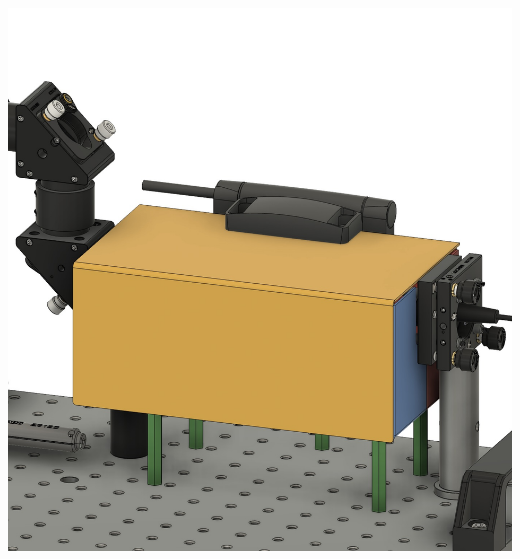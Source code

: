 \begin{minipage}{\textwidth}
    \begin{minipage}[c]{0.48\textwidth}
        \begin{center}
            \includegraphics[width=\textwidth]{assets/figures/Protections_laser/Securite_mecanique/Protection_entree_laser/model_3D_ferme.jpeg}
        \end{center}
        \label{model_3D_ferme}
    \end{minipage}\hfill
    \begin{minipage}[c]{0.48\textwidth}
        \begin{center}

\end{center}
\end{minipage}
\end{minipage}
